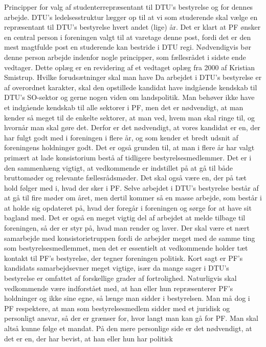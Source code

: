 Principper for valg af studenterrepræsentant til DTU’s bestyrelse og for dennes arbejde.
DTU’s ledelsesstruktur lægger op til at vi som studerende skal vælge en repræsentant til DTU’s bestyrelse hvert andet
(lige) år. Det er klart at PF ønsker en central person i foreningen valgt til at varetage denne post, fordi det er den mest
magtfulde post en studerende kan bestride i DTU regi. Nødvendigvis bør denne person arbejde indenfor nogle
principper, som fællesrådet i sidste ende vedtager. Dette oplæg er en revidering af et vedtaget oplæg fra 2000 af Kristian
Smistrup.
Hvilke forudsætninger skal man have
Da arbejdet i DTU’s bestyrelse er af overordnet karakter, skal den opstillede kandidat have indgående kendskab til
DTU’s SO-sektor og gerne nogen viden om landspolitik. Man behøver ikke have et indgående kendskab til alle sektorer
i PF, men det er nødvendigt, at man kender så meget til de enkelte sektorer, at man ved, hvem man skal ringe til, og
hvornår man skal gøre det.
Derfor er det nødvendigt, at vores kandidat er en, der har fulgt godt med i foreningen i flere år, og som kender et bredt
udsnit af foreningens holdninger godt. Det er også grunden til, at man i flere år har valgt primært at lade konsistorium
bestå af tidligere bestyrelsesmedlemmer. Det er i den sammenhæng vigtigt, at vedkommende er indstillet på at gå til
både bruttomøder og relevante fællesrådsmøder.
Det skal også være en, der på tæt hold følger med i, hvad der sker i PF. Selve arbejdet i DTU’s bestyrelse består af at gå
til fire møder om året, men dertil kommer så en masse arbejde, som består i at holde sig opdateret på, hvad der foregår i
foreningen og sørge for at have sit bagland med. Det er også en meget vigtig del af arbejdet at melde tilbage til
foreningen, så der er styr på, hvad man render og laver. Der skal være et nært samarbejde med konsistorietruppen fordi
de arbejder meget med de samme ting som bestyrelsesmedlemmet, men det er essentielt at vedkommende holder tæt
kontakt til PF’s bestyrelse, der tegner foreningen politisk. Kort sagt er PF’s kandidats samarbejdsevner meget vigtige,
især da mange sager i DTU’s bestyrelse er omfattet af forskellige grader af fortrolighed.
Naturligvis skal vedkommende være indforstået med, at han eller hun repræsenterer PF’s holdninger og ikke sine egne,
så længe man sidder i bestyrelsen. Man må dog i PF respektere, at man som bestyrelsesmedlem sidder med et juridisk
og personligt ansvar, så der er grænser for, hvor langt man kan gå for PF. Man skal altså kunne følge et mandat.
På den mere personlige side er det nødvendigt, at det er en, der har bevist, at han eller hun har politisk
